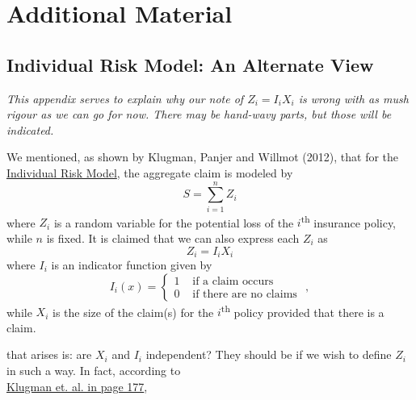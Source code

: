 \documentclass[notoc,notitlepage]{tufte-book}
\begin{document}


\appendix

\chapter{Additional Material}%
\label{chp:additional_material}

\section{Individual Risk Model: An Alternate View}%
\label{sec:individual_risk_model_an_alternate_view}

\textit{This appendix serves to explain why our note of $Z_i = I_i X_i$ is wrong with as mush rigour as we can go for now. There may be hand-wavy parts, but those will be indicated.} 

We mentioned, as shown by Klugman, Panjer and Willmot (2012)\cite{KlugmanPanjerWillmot2012}, that for the \hyperref[defn:individual_risk_model]{Individual Risk Model}, the aggregate claim is modeled by
\begin{equation*}
  S = \sum_{i=1}^{n} Z_i
\end{equation*}
where $Z_i$ is a random variable for the potential loss of the $i$\textsuperscript{th} insurance policy, while $n$ is fixed. It is claimed that we can also express each $Z_i$ as
\begin{equation*}
  Z_i = I_i X_i
\end{equation*}
where $I_i$ is an indicator function given by
\begin{equation*}
  I_i(x) = \begin{cases}
    1 & \text{ if a claim occurs } \\
    0 & \text{ if there are no claims }
  \end{cases},
\end{equation*}
while $X_i$ is the size of the claim(s) for the $i$\textsuperscript{th} policy provided that there is a claim.

 that arises is: are $X_i$ and $I_i$ independent? They should be if we wish to define $Z_i$ in such a way. In fact, according to \\
\noindent\textcolor{base16-eighties-magenta}{\underline{Klugman et. al. in page 177}},
\end{document}
